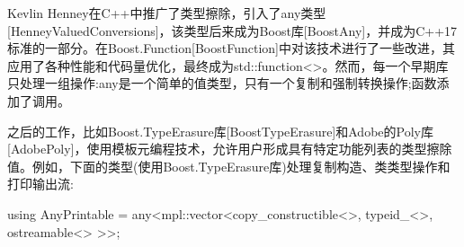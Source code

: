 Kevlin Henney在C++中推广了类型擦除，引入了any类型[HenneyValuedConversions]，该类型后来成为Boost库[BoostAny]，并成为C++17标准的一部分。在Boost.Function[BoostFunction]中对该技术进行了一些改进，其应用了各种性能和代码量优化，最终成为std::function<>。然而，每一个早期库只处理一组操作:any是一个简单的值类型，只有一个复制和强制转换操作;函数添加了调用。

之后的工作，比如Boost.TypeErasure库[BoostTypeErasure]和Adobe的Poly库[AdobePoly]，使用模板元编程技术，允许用户形成具有特定功能列表的类型擦除值。例如，下面的类型(使用Boost.TypeErasure库)处理复制构造、类类型操作和打印输出流:

\begin{cpp}
using AnyPrintable = any<mpl::vector<copy_constructible<>,
									typeid_<>,
									ostreamable<>
									>>;
\end{cpp}